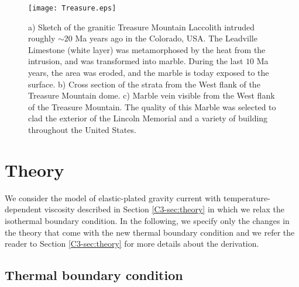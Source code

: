 \begin{figure}[h!]
  \begin{center}
    \graphicspath{ {/Users/thorey/Documents/These/Manuscript/Figure/Chapter4/} }
    \texttt{[image: Treasure.eps]}
    \caption{a)  Sketch of  the granitic  Treasure Mountain  Laccolith
      intruded  roughly  $\sim  20$  Ma years  ago  in  the  Colorado,
      USA. The Leadville Limestone  (white layer) was metamorphosed by
      the heat  from the intrusion,  and was transformed  into marble.
      During the  last $10$  Ma years,  the area  was eroded,  and the
      marble is today exposed to the surface.  b) Cross section of the
      strata from  the West  flank of the  Treasure Mountain  dome. c)
      Marble  vein  visible  from  the  West  flank  of  the  Treasure
      Mountain. The  quality of this  Marble was selected to  clad the
      exterior  of the  Lincoln  Memorial and  a  variety of  building
      throughout the United States.}
    \label{Treasure}
  \end{center}
\end{figure}
\newpage
\section{Theory}
\label{C4-sec:theory-1}

We  consider   the  model  of  elastic-plated   gravity  current  with
temperature-dependent      viscosity     described      in     Section
\ref{C3-sec:theory}  in   which  we  relax  the   isothermal  boundary
condition. In the following, we specify only the changes in the theory
that come  with the new  thermal boundary  condition and we  refer the
reader  to  Section \ref{C3-sec:theory}  for  more  details about  the
derivation.

\subsection{Thermal boundary condition}
\label{C4-sec:formulation-1}

